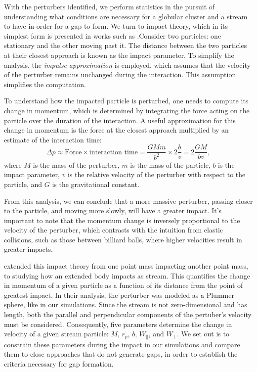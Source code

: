 \documentclass{aa}
\begin{document}
\begin{appendix}
      With the perturbers identified, we perform statistics in the pursuit of understanding what conditions are necessary for a globular cluster and a stream to have in order for a gap to form. We turn to impact theory, which in its simplest form is presented in works such as \citet{2008gady.book.....B}.Consider two particles: one stationary and the other moving past it. The distance between the two particles at their closest approach is known as the impact parameter. To simplify the analysis, the \textit{impulse approximation} is employed, which assumes that the velocity of the perturber remains unchanged during the interaction. This assumption simplifies the computation.

      To understand how the impacted particle is perturbed, one needs to compute its change in momentum, which is determined by integrating the force acting on the particle over the duration of the interaction. A useful approximation for this change in momentum is the force at the closest approach multiplied by an estimate of the interaction time:
      \begin{equation} 
        \Delta p \approx \text{Force} \times \text{interaction time} = \frac{GMm}{b^2} \times 2\frac{b}{v} = 2\frac{GM}{bv}, 
        \end{equation} 
      where $M$ is the mass of the perturber, $m$ is the mass of the particle, $b$ is the impact parameter, $v$ is the relative velocity of the perturber with respect to the particle, and $G$ is the gravitational constant.

      From this analysis, we can conclude that a more massive perturber, passing closer to the particle, and moving more slowly, will have a greater impact. It's important to note that the momentum change is inversely proportional to the velocity of the perturber, which contrasts with the intuition from elastic collisions, such as those between billiard balls, where higher velocities result in greater impacts.

      \citet{2015MNRAS.450.1136E} extended this impact theory from one point mass impacting another point mass, to studying how an extended body impacts as stream. This quantifies the change in momentum of a given particle as a function of its distance from the point of greatest impact. In their analysis, the perturber was modeled as a Plummer sphere, like in our simulations. Since the stream is not zero-dimensional and has length, both the parallel and perpendicular components of the pertuber's velocity must be considered. Consequently, five parameters determine the change in velocity of a given stream particle: $M$, $r_p$, $b$, $W_\parallel$, and $W_\perp$. We set out is to constrain these parameters during the impact in our simulations and compare them to close approaches that do not generate gaps, in order to establish the criteria necessary for gap formation.


\end{appendix}
\end{document}

